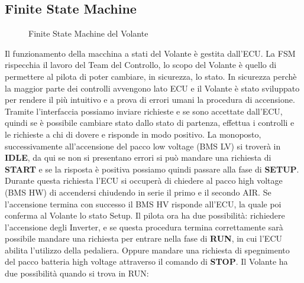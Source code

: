 \subsection{Finite State Machine}

\begin{figure}[hbt!]
    \begin{center}
    \end{center}
    \caption{Finite State Machine del Volante}
\end{figure}

Il funzionamento della macchina a stati del Volante è gestita dall'ECU. 
La FSM rispecchia il lavoro del Team del Controllo, lo scopo del Volante è quello di permettere al pilota 
di poter cambiare, in sicurezza, lo stato. In sicurezza perchè la maggior parte dei controlli avvengono lato ECU
e il Volante è stato sviluppato per rendere il più intuitivo e a prova di errori umani la procedura di accensione. 
Tramite l'interfaccia possiamo inviare richieste e se sono accettate dall'ECU, quindi se è possibile cambiare stato dallo stato di partenza,
effettua i controlli e le richieste a chi di dovere e risponde in modo positivo.
La monoposto, successivamente all'accensione del pacco low voltage (BMS LV) si troverà in \textbf{IDLE}, 
da qui se non si presentano errori si può mandare una richiesta di \textbf{START} 
e se la risposta è positiva possiamo quindi passare alla fase di \textbf{SETUP}. 
Durante questa richiesta l'ECU si occuperà di chiedere al pacco high voltage (BMS HW) di accendersi chiudendo in serie il primo e il secondo AIR. 
Se l'accensione termina con successo il BMS HV risponde all'ECU, la quale poi conferma al Volante lo stato Setup.
Il pilota ora ha due possibilità: richiedere l'accensione degli Inverter, e se questa procedura termina correttamente
sarà possibile mandare una richiesta per entrare nella fase di \textbf{RUN}, in cui l'ECU abilita l'utilizzo della pedaliera.
Oppure mandare una richiesta di spegnimento del pacco batteria high voltage attraverso il comando di \textbf{STOP}.
Il Volante ha due possibilità quando si trova in RUN: 

